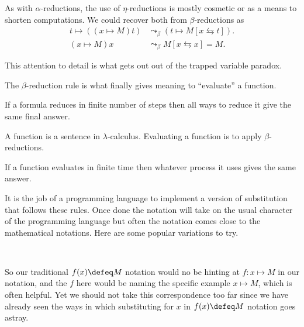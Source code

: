 As with $\alpha$-reductions, the use of $\eta$-reductions is mostly cosmetic 
or as a means to shorten computations.  We could recover both from
$\beta$-reductions as 
\begin{align*}
    t\mapsto ((x\mapsto M)t) & \leadsto_{\beta} (t\mapsto M[x\leftrightarrows t]).\\
    (x\mapsto M)x & \leadsto_{\beta} M[x\leftrightarrows x]=M.
\end{align*}


This attention to detail 
is what gets out out of the trapped variable paradox.



The $\beta$-reduction rule is what finally gives meaning to ``evaluate'' a function.

\begin{theorem}
    If a formula reduces in finite number of steps then all ways to reduce it give the same 
    final answer.
\end{theorem}


\begin{definition}
    A function is a sentence in $\lambda$-calculus.
    Evaluating a function is to apply $\beta$-reductions.
\end{definition}

\begin{corollary}
    If a function evaluates in finite time then whatever process it uses 
    gives the same answer.
\end{corollary}



It is the job of a programming language to implement a version 
of substitution that follows these rules.  Once done the notation will take 
on the usual character of the programming language but often the notation 
comes close to the mathematical notations.  Here are some popular variations to try.
\begin{center}
    \hspace{1cm}
    \hspace{1cm}
    \\
    \hspace{1cm}
\end{center} 


So our traditional $f(x)\defeq M$ notation would no be hinting at 
$f:x\mapsto M$ in our notation, and the $f$ here would be naming 
the specific example $x\mapsto M$, which is often helpful.  Yet 
we should not take this correspondence too far since we have already 
seen the ways in which substituting for $x$ in $f(x)\defeq M$ notation 
goes astray.

